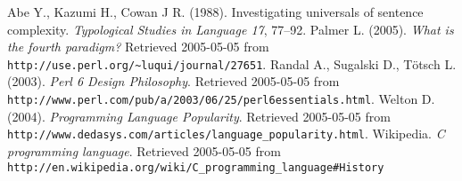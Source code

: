 \documentclass[12pt]{article}
\begin{document}
\begin{thebibliography}{4in}
\raggedright
{} Abe Y., Kazumi H., Cowan J R. (1988).
Investigating universals of sentence complexity.  \textit{Typological
Studies in Language 17}, 77--92.
 Palmer L. (2005).  \textit{What is the fourth
paradigm?}  Retrieved 2005-05-05 from 
\verb+http://use.perl.org/~luqui/journal/27651+.
 Randal A., Sugalski D., T\"otsch
L. (2003).  \textit{Perl 6 Design Philosophy}.  Retrieved 2005-05-05
from \verb+http://www.perl.com/pub/a/2003/06/25/perl6essentials.html+.
 Welton D. (2004). \textit{Programming Language
Popularity}.  Retrieved 2005-05-05 from
\verb+http://www.dedasys.com/articles/language_popularity.html+.
 Wikipedia.  \textit{C programming
language}.  Retrieved 2005-05-05 from 
\verb+http://en.wikipedia.org/wiki/C_programming_language#History+
\end{thebibliography}
\end{document}
